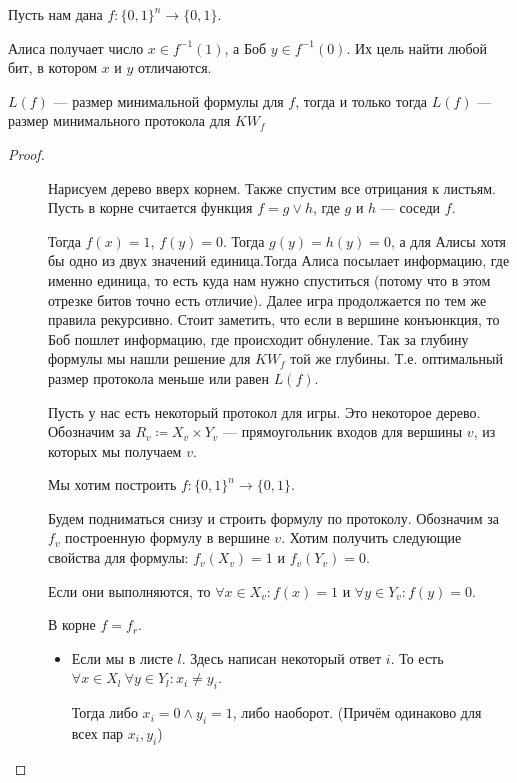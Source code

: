 Пусть нам дана $ f\colon \{0, 1\}^{n } \to  \{0, 1\}$.

Алиса получает число $ x \in f^{-1}(1)$, а Боб $ y \in f^{-1}(0)$. Их цель найти любой бит, в котором $x$ и $y$ отличаются.

\begin{thm}
	$ L(f) $ --- размер минимальной формулы для  $ f$, тогда и только тогда $ L(f)$ --- размер минимального протокола для  $ KW_f$
\end{thm}
\begin{proof}
    $ $
    \begin{description}
		\item [] Нарисуем дерево вверх корнем. Также спустим все отрицания к листьям. Пусть в корне считается функция $ f = g \vee h$, где  $ g$ и  $h$ --- соседи  $ f$.

			Тогда $ f(x) = 1$,  $ f(y) = 0$. Тогда $g(y) = h(y) = 0    $, а для Алисы хотя бы одно из двух значений единица.Тогда Алиса посылает информацию, где именно единица, то есть куда нам нужно спуститься (потому что в этом отрезке битов точно есть отличие). Далее игра продолжается по тем же правила рекурсивно. Стоит заметить, что если в вершине конъюнкция, то Боб пошлет информацию, где происходит обнуление. Так за глубину формулы мы нашли решение для $KW_f$ той же глубины. Т.е. оптимальный размер протокола меньше или равен $L(f)$.
		\item [] 
			Пусть у нас есть некоторый протокол для игры. Это некоторое дерево. Обозначим за $ R_v \coloneqq X_v \times Y_v$ --- прямоугольник входов для вершины $ v$, из которых мы получаем $ v$.

			Мы хотим построить $ f\colon \{0, 1\}^{n} \to \{0, 1\}$.

			Будем подниматься снизу и строить формулу по протоколу. Обозначим за $ f_v$ построенную формулу в вершине  $ v$. Хотим получить следующие свойства для формулы: $ f_v(X_v) = 1$ и  $ f_v(Y_v) = 0$.

			Если они выполняются, то $ \forall x \in X_v \colon f(x) = 1$ и $ \forall y \in Y_v \colon f(y) = 0$.

			В корне $ f = f_r$.

			\begin{itemize}
				\item Если мы в листе $ l$. Здесь написан некоторый ответ $i$. То есть $ \forall x \in X_l ~\forall y \in Y_l \colon x_i \ne  y_i$.

					Тогда либо $ x_i = 0 \wedge  y_i  = 1$, либо наоборот. (Причём одинаково для всех пар $ x_i, y_i$) %


\end{itemize}
\end{description}
\end{proof}
